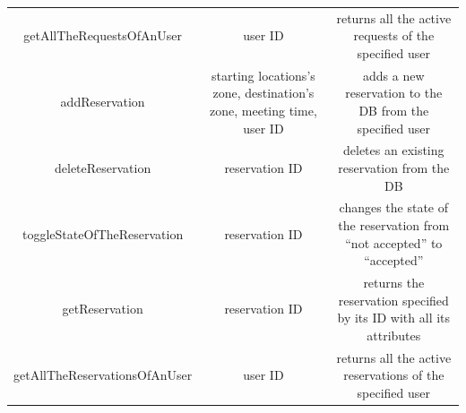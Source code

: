 \documentclass{article}
\begin{document}
\begin{itemize}
\begin{tabular}{*{3}{c}}
			getAllTheRequestsOfAnUser & user ID & returns all the active requests of the specified user \\
			addReservation & starting locations's zone, destination's zone, meeting time, user ID & adds a new reservation to the DB from the specified user\\
			deleteReservation & reservation ID & deletes an existing reservation from the DB\\
			toggleStateOfTheReservation & reservation ID & changes the state of the reservation from ``not accepted'' to ``accepted''\\
			getReservation & reservation ID & returns the reservation specified by its ID with all its attributes\\
			getAllTheReservationsOfAnUser & user ID & returns all the active reservations of the specified user \\ %
			\bottomrule
		\end{tabular}	
\end{itemize}
\end{document}
